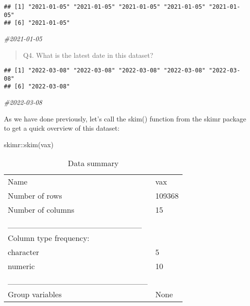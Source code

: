 \documentclass[
]{article}
\newenvironment{Shaded}{\begin{snugshade}}{\end{snugshade}}
\newcommand{\CommentTok}[1]{\textcolor[rgb]{0.56,0.35,0.01}{\textit{#1}}}
\newcommand{\FunctionTok}[1]{\textcolor[rgb]{0.00,0.00,0.00}{#1}}
\newcommand{\NormalTok}[1]{#1}
\newcommand{\SpecialCharTok}[1]{\textcolor[rgb]{0.00,0.00,0.00}{#1}}
\begin{document}
\begin{verbatim}
## [1] "2021-01-05" "2021-01-05" "2021-01-05" "2021-01-05" "2021-01-05"
## [6] "2021-01-05"
\end{verbatim}

\begin{Shaded}
\begin{Highlighting}[]
\CommentTok{\#2021{-}01{-}05}
\end{Highlighting}
\end{Shaded}

\begin{quote}
Q4. What is the latest date in this dataset?
\end{quote}

\begin{Shaded}
\end{Shaded}

\begin{verbatim}
## [1] "2022-03-08" "2022-03-08" "2022-03-08" "2022-03-08" "2022-03-08"
## [6] "2022-03-08"
\end{verbatim}

\begin{Shaded}
\begin{Highlighting}[]
\CommentTok{\#2022{-}03{-}08}
\end{Highlighting}
\end{Shaded}

As we have done previously, let's call the skim() function from the
skimr package to get a quick overview of this dataset:

\begin{Shaded}
\begin{Highlighting}[]
\NormalTok{skimr}\SpecialCharTok{::}\FunctionTok{skim}\NormalTok{(vax)}
\end{Highlighting}
\end{Shaded}

\begin{longtable}[]{@{}ll@{}}
\caption{Data summary}\tabularnewline
\toprule
\endhead
Name & vax \\
Number of rows & 109368 \\
Number of columns & 15 \\
\_\_\_\_\_\_\_\_\_\_\_\_\_\_\_\_\_\_\_\_\_\_\_ & \\
Column type frequency: & \\
character & 5 \\
numeric & 10 \\
\_\_\_\_\_\_\_\_\_\_\_\_\_\_\_\_\_\_\_\_\_\_\_\_ & \\
Group variables & None \\
\bottomrule
\end{longtable}
\end{document}
